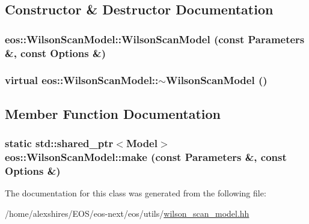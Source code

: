 \subsection{Constructor \& Destructor Documentation}
\hypertarget{classeos_1_1WilsonScanModel_a2fe7c661cc571ee01d4b3fecc226faa3}{
\subsubsection[{WilsonScanModel}]{\setlength{\rightskip}{0pt plus 5cm}eos::WilsonScanModel::WilsonScanModel (const {\bf Parameters} \&, \/  const {\bf Options} \&)}}
\label{classeos_1_1WilsonScanModel_a2fe7c661cc571ee01d4b3fecc226faa3}
\hypertarget{classeos_1_1WilsonScanModel_a58838548fa93543a0c2738e5b8ff4509}{
\subsubsection[{$\sim$WilsonScanModel}]{\setlength{\rightskip}{0pt plus 5cm}virtual eos::WilsonScanModel::$\sim$WilsonScanModel ()}}
\label{classeos_1_1WilsonScanModel_a58838548fa93543a0c2738e5b8ff4509}


\subsection{Member Function Documentation}
\hypertarget{classeos_1_1WilsonScanModel_a34b4ce1af19a406f354b4bbaf461df40}{
\subsubsection[{make}]{\setlength{\rightskip}{0pt plus 5cm}static std::shared\_\-ptr$<${\bf Model}$>$ eos::WilsonScanModel::make (const {\bf Parameters} \&, \/  const {\bf Options} \&)}}
\label{classeos_1_1WilsonScanModel_a34b4ce1af19a406f354b4bbaf461df40}


The documentation for this class was generated from the following file:\begin{DoxyCompactItemize}
\item 
/home/alexshires/EOS/eos-\/next/eos/utils/\hyperlink{wilson__scan__model_8hh}{wilson\_\-scan\_\-model.hh}\end{DoxyCompactItemize}
